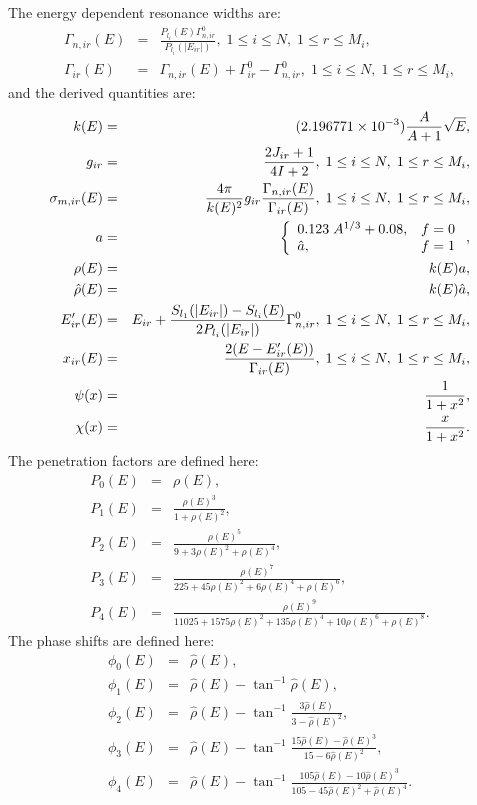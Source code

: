 The energy dependent resonance widths are:
\begin{eqnarray}
\Gamma_{n,ir}(E) &=& \frac{P_{l_i}(E)\Gamma_{n,ir}^0}{P_{l_i}(|E_{ir}|)}, \;1\leq i\leq N,\;1\leq r\leq M_i,\\
\Gamma_{ir}(E) &=& \Gamma_{n,ir}(E) + \Gamma_{ir}^0 - \Gamma_{n,ir}^0, \;1\leq i\leq N,\;1\leq r\leq M_i,
\end{eqnarray}
and the derived quantities are:
\begin{eqnarray}
k(E) &=& (2.196771\times10^{-3})\frac{A}{A+1}\sqrt{E},\\
g_{ir} &=& \frac{2J_{ir}+1}{4I+2},\; 1\leq i\leq N,\;1\leq r\leq M_i,\\
\sigma_{m,ir}(E) &=& \frac{4\pi}{k(E)^2}g_{ir}\frac{\Gamma_{n,ir}(E)}{\Gamma_{ir}(E)},\; 1\leq i\leq N,\;1\leq r\leq M_i,\\
a &=& \left\{\begin{array}{l l}0.123\;A^{1/3}+0.08, & f=0 \\\hat{a}, & f=1 \end{array}\right.,\\
\rho(E) &=& k(E)a,\\
\hat{\rho}(E) &=& k(E)\hat{a},\\
E_{ir}'(E) &=& E_{ir}+\frac{S_{l_1}(|E_{ir}|)-S_{l_i}(E)}{2P_{l_i}(|E_{ir}|)}\Gamma_{n,ir}^0,\; 1\leq i\leq N,\;1\leq r\leq M_i,\\
x_{ir}(E) &=& \frac{2(E-E_{ir}'(E))}{\Gamma_{ir}(E)},\; 1\leq i\leq N,\;1\leq r\leq M_i,\\
\psi(x) &=& \frac{1}{1+x^2},\\
\chi(x) &=& \frac{x}{1+x^2}.
\end{eqnarray}
The penetration factors are defined here:
\begin{eqnarray}
P_0(E) &=& \rho(E),\\
P_1(E) &=& \frac{\rho(E)^3}{1+\rho(E)^2},\\
P_2(E) &=& \frac{\rho(E)^5}{9+3\rho(E)^2+\rho(E)^4},\\
P_3(E) &=& \frac{\rho(E)^7}{225+45\rho(E)^2+6\rho(E)^4+\rho(E)^6},\\
P_4(E) &=& \frac{\rho(E)^9}{11025+1575\rho(E)^2+135\rho(E)^4+10\rho(E)^6+\rho(E)^8}.
\end{eqnarray}
The phase shifts are defined here:
\begin{eqnarray}
\phi_0(E) &=& \hat{\rho}(E),\\
\phi_1(E) &=& \hat{\rho}(E)-\tan^{-1}\hat{\rho}(E),\\
\phi_2(E) &=& \hat{\rho}(E)-\tan^{-1}\frac{3\hat{\rho}(E)}{3-\hat{\rho}(E)^2},\\
\phi_3(E) &=& \hat{\rho}(E)-\tan^{-1}\frac{15\hat{\rho}(E)-\hat{\rho}(E)^3}{15-6\hat{\rho}(E)^2},\\
\phi_4(E) &=& \hat{\rho}(E)-\tan^{-1}\frac{105\hat{\rho}(E)-10\hat{\rho}(E)^3}{105-45\hat{\rho}(E)^2+\hat{\rho}(E)^4}.
\end{eqnarray}
